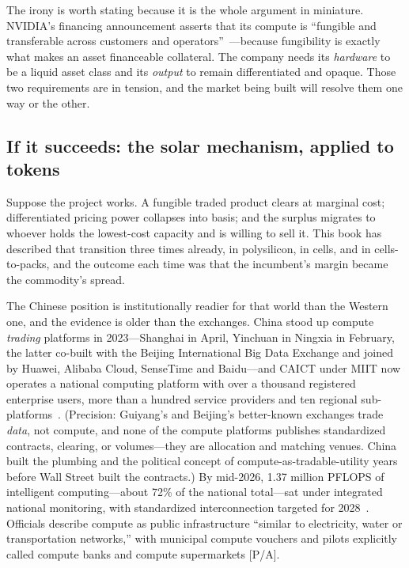 The irony is worth stating because it is the whole argument in miniature. NVIDIA's financing announcement asserts that its compute is ``fungible and transferable across customers and operators''~\cite{nvda-500b}---because fungibility is exactly what makes an asset financeable collateral. The company needs its \emph{hardware} to be a liquid asset class and its \emph{output} to remain differentiated and opaque. Those two requirements are in tension, and the market being built will resolve them one way or the other.

\subsection{If it succeeds: the solar mechanism, applied to tokens}

Suppose the project works. A fungible traded product clears at marginal cost; differentiated pricing power collapses into basis; and the surplus migrates to whoever holds the lowest-cost capacity and is willing to sell it. This book has described that transition three times already, in polysilicon, in cells, and in cells-to-packs, and the outcome each time was that the incumbent's margin became the commodity's spread.

The Chinese position is institutionally readier for that world than the Western one, and the evidence is older than the exchanges. China stood up compute \emph{trading} platforms in 2023---Shanghai in April, Yinchuan in Ningxia in February, the latter co-built with the Beijing International Big Data Exchange and joined by Huawei, Alibaba Cloud, SenseTime and Baidu---and CAICT under MIIT now operates a national computing platform with over a thousand registered enterprise users, more than a hundred service providers and ten regional sub-platforms~\cite{china-compute-exchanges}. (Precision: Guiyang's and Beijing's better-known exchanges trade \emph{data}, not compute, and none of the compute platforms publishes standardized contracts, clearing, or volumes---they are allocation and matching venues. China built the plumbing and the political concept of compute-as-tradable-utility years before Wall Street built the contracts.) By mid-2026, 1.37 million PFLOPS of intelligent computing---about 72\% of the national total---sat under integrated national monitoring, with standardized interconnection targeted for 2028~\cite{china-compute-network}. Officials describe compute as public infrastructure ``similar to electricity, water or transportation networks,'' with municipal compute vouchers and pilots explicitly called compute banks and compute supermarkets [P/A].

